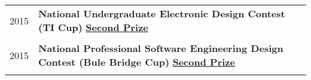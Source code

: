 \documentclass[a4paper,10pt]{article} %
\begin{document}
\begin{tabular}{r|l}
2015                     & \textbf{National Undergraduate Electronic Design Contest (TI Cup)} \href{https://nbviewer.org/github/HuangJiaLian/DataBase0/blob/bc9a8cc844b7cf3b1c44c40593df3afc35dd11b9/uPic/2021_11_26_10_electronic_design_contest.pdf}{\textbf{Second Prize}} \\
\multicolumn{2}{c}{} \\	%
2015
                     & \textbf{National Professional Software Engineering Design Contest (Bule Bridge Cup)} \href{https://nbviewer.org/github/HuangJiaLian/DataBase0/blob/635fde31b9e18ebe419164ec02e22baeb0968fe8/uPic/2021_12_17_17_blue_bredge.pdf}{\textbf{Second Prize}} \\
\multicolumn{2}{c}{} \\	%

\end{tabular}
\end{document}
